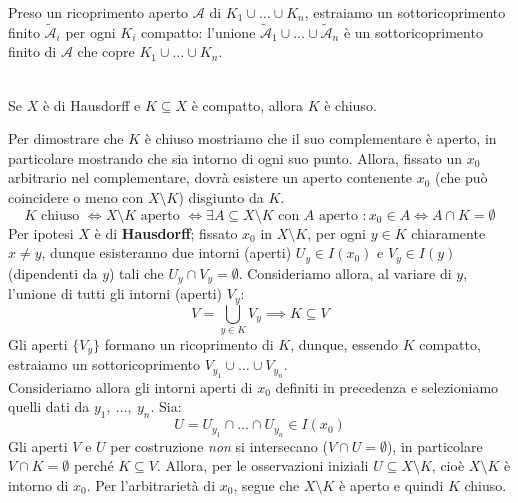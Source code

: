 \begin{lemming}
\end{lemming}
\begin{demonstration}
Preso un ricoprimento aperto $\mathcal{A}$ di $K_1\cup\ldots\cup K_n$, estraiamo un sottoricoprimento finito $\widetilde{\mathcal{A}}_i$ per ogni $K_i$ compatto: l'unione $\widetilde{\mathcal{A}}_1\cup\ldots\cup \widetilde{\mathcal{A}}_n$ è un sottoricoprimento finito di $\mathcal{A}$ che copre $K_1\cup\ldots\cup K_n$.
\end{demonstration}
\begin{theorema}~{}\label{compatto in hausdorff chiuso}\\
Se $X$ è di Hausdorff e $K\subseteq X$ è compatto, allora $K$ è chiuso.
\end{theorema}
\begin{demonstration}
	Per dimostrare che $K$ è chiuso mostriamo che il suo complementare è aperto, in particolare mostrando che sia intorno di ogni suo punto.
	Allora, fissato un $x_0$ arbitrario nel complementare, dovrà esistere un aperto contenente $x_0$ (che può coincidere o meno con $X\setminus K$) disgiunto da $K$.
		\begin{equation*}
				K \text{ chiuso } \iff X\setminus K \text{ aperto } \iff \exists A\subseteq X\setminus K \text{ con } A \text{ aperto } \colon x_0\in A \iff A\cap K=\emptyset
		\end{equation*}
	Per ipotesi $X$ è di \textbf{Hausdorff}; fissato $x_0$ in $X\setminus K$, per ogni $y\in K$ chiaramente $x\neq y$, dunque esisteranno due intorni (aperti) $U_y\in I(x_0)$ e $V_y\in I(y)$ (dipendenti da $y$) tali che $U_y\cap V_y=\emptyset$. Consideriamo allora, al variare di $y$, l'unione di tutti gli intorni (aperti) $V_y$:
	\begin{equation*}
			V=\bigcup_{y\in K}V_y \implies K\subseteq V
	\end{equation*}
	Gli aperti $\{V_y\}$ formano un ricoprimento di $K$, dunque, essendo $K$ compatto, estraiamo un sottoricoprimento $V_{y_1}\cup\ldots\cup V_{y_n}$.\\
	Consideriamo allora gli intorni aperti di $x_0$ definiti in precedenza e selezioniamo quelli dati da $y_1,\ \ldots,\ y_n$. Sia:
	\begin{equation*}
		U=U_{y_1}\cap\ldots\cap U_{y_n} \in I(x_0)
	\end{equation*}
	Gli aperti $V$ e $U$ per costruzione \textit{non} si intersecano ($V\cap U=\emptyset$), in particolare $V\cap K=\emptyset$ perché $K\subseteq V$. Allora, per le osservazioni iniziali $U\subseteq X\setminus K$, cioè $X\setminus K$ è intorno di $x_0$. Per l'arbitrarietà di $x_0$, segue che $X\setminus K$ è aperto e quindi $K$ chiuso.
\end{demonstration}

